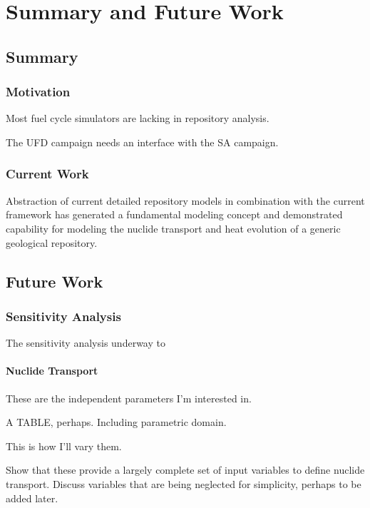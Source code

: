 \chapter{Summary and Future Work}\label{ch:future}

\section{Summary}

\subsection{Motivation}

Most fuel cycle simulators are lacking in repository analysis. 

The \gls{UFD} campaign needs an interface with the \gls{SA} campaign.

\subsection{Current Work}

Abstraction of current detailed repository models in combination with the 
current \Cyclus framework has generated a fundamental modeling concept and 
demonstrated capability for modeling the nuclide transport and heat evolution of 
a generic geological repository.

\section{Future Work}

\subsection{Sensitivity Analysis}

The sensitivity analysis underway to 


\subsubsection{Nuclide Transport}

These are the independent parameters I'm interested in.

A TABLE, perhaps. Including parametric domain.

This is how I'll vary them.

Show that these provide a largely complete set of input variables to define 
nuclide transport. Discuss variables that are being neglected for simplicity, 
perhaps to be added later. 

